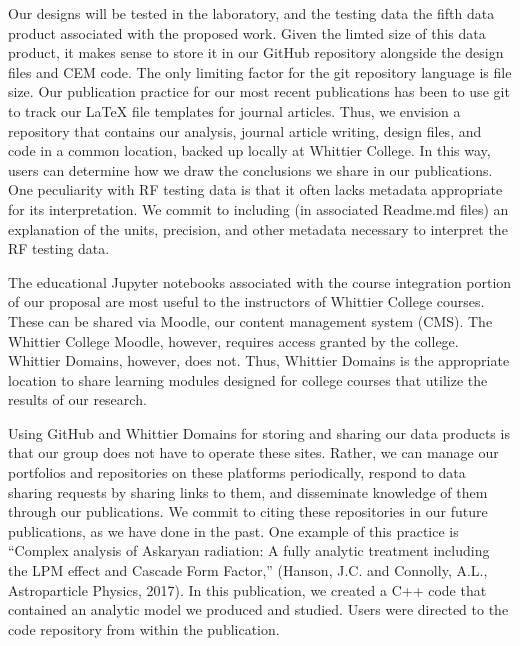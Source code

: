 \documentclass[../../main.tex]{subfiles}
\begin{document}
Our designs will be tested in the laboratory, and the testing data the fifth data product associated with the proposed work.  Given the limted size of this data product, it makes sense to store it in our GitHub repository alongside the design files and CEM code.  The only limiting factor for the git repository language is file size.  Our publication practice for our most recent publications has been to use git to track our LaTeX file templates for journal articles.  Thus, we envision a repository that contains our analysis, journal article writing, design files, and code in a common location, backed up locally at Whittier College.  In this way, users can determine how we draw the conclusions we share in our publications.  One peculiarity with RF testing data is that it often lacks metadata appropriate for its interpretation.  We commit to including (in associated Readme.md files) an explanation of the units, precision, and other metadata necessary to interpret the RF testing data.  \\ \vspace{2.5mm}

The educational Jupyter notebooks associated with the course integration portion of our proposal are most useful to the instructors of Whittier College courses.  These can be shared via Moodle, our content management system (CMS).  The Whittier College Moodle, however, requires access granted by the college.  Whittier Domains, however, does not.  Thus, Whittier Domains is the appropriate location to share learning modules designed for college courses that utilize the results of our research. \\ \vspace{2.5mm}

Using GitHub and Whittier Domains for storing and sharing our data products is that our group does not have to operate these sites.  Rather, we can manage our portfolios and repositories on these platforms periodically, respond to data sharing requests by sharing links to them, and disseminate knowledge of them through our publications.  We commit to citing these repositories in our future publications, as we have done in the past.  One example of this practice is ``Complex analysis of Askaryan radiation: A fully analytic treatment including the LPM effect and Cascade Form Factor,'' (Hanson, J.C. and Connolly, A.L., Astroparticle Physics, 2017).  In this publication, we created a C++ code that contained an analytic model we produced and studied.  Users were directed to the code repository from within the publication.  \\ \vspace{2.5mm}
\end{document}
